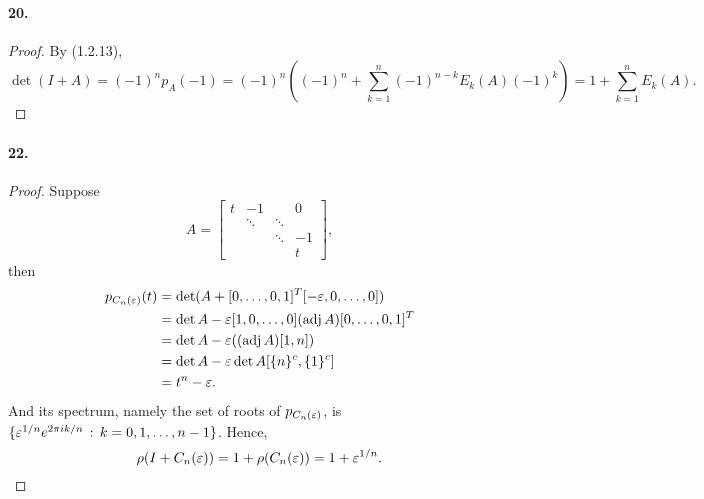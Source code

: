   \paragraph{20.}
  \begin{proof}
    By (1.2.13), 
    \[
      \det(I+A) = (-1)^n p_A(-1) = 
      (-1)^n\left((-1)^n + \sum_{k=1}^n(-1)^{n-k}E_k(A)(-1)^k \right)
      = 1 + \sum_{k=1}^n E_k(A).
    \]
  \end{proof}

  \paragraph{22.} 
  \begin{proof}
    Suppose
    \[
      A = 
      \begin{bmatrix}
        t    & -1     &        & 0 \\
             & \ddots & \ddots &   \\
             &        & \ddots & -1 \\
             &        &        & t
      \end{bmatrix},
    \]
    then
    \begin{align*}
      p_{C_n(\varepsilon)}(t)
      &= \det(A + [0,\dots,0,1]^T [-\varepsilon,0,\dots,0]) \\
      &= \det A - \varepsilon [1, 0,\dots,0](\operatorname{adj} A) [0,\dots,0,1]^T \\
      &= \det A - \varepsilon ((\operatorname{adj} A)[1,n]) \\
      &= \det A - \varepsilon \det A[\{n\}^c, \{1\}^c] \\
      &= t^n - \varepsilon.
    \end{align*}
    And its spectrum, namely the set of roots of $p_{C_n(\varepsilon)}$, is $\{
    \varepsilon^{1/n} e^{2\pi ik/n}\,:\,k=0,1,\dots,n-1\}$. Hence,
    \[
      \rho(I+C_n(\varepsilon)) = 1 + \rho(C_n(\varepsilon)) = 1+\varepsilon^{1/n}.
    \]
  \end{proof}  


